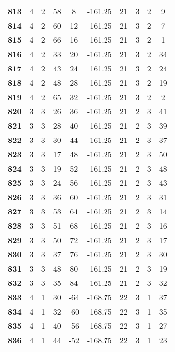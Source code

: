 \documentclass{article}%
\begin{document}
\begin{longtable}{cccccccccc}
        \textbf{813} & 4 & 2 & 58 & 8 & -161.25 & 21 & 3 & 2 & 9 \\ 
        \textbf{814} & 4 & 2 & 60 & 12 & -161.25 & 21 & 3 & 2 & 7 \\ 
        \textbf{815} & 4 & 2 & 66 & 16 & -161.25 & 21 & 3 & 2 & 1 \\ 
        \textbf{816} & 4 & 2 & 33 & 20 & -161.25 & 21 & 3 & 2 & 34 \\ 
        \textbf{817} & 4 & 2 & 43 & 24 & -161.25 & 21 & 3 & 2 & 24 \\ 
        \textbf{818} & 4 & 2 & 48 & 28 & -161.25 & 21 & 3 & 2 & 19 \\ 
        \textbf{819} & 4 & 2 & 65 & 32 & -161.25 & 21 & 3 & 2 & 2 \\ 
        \textbf{820} & 3 & 3 & 26 & 36 & -161.25 & 21 & 2 & 3 & 41 \\ 
        \textbf{821} & 3 & 3 & 28 & 40 & -161.25 & 21 & 2 & 3 & 39 \\ 
        \textbf{822} & 3 & 3 & 30 & 44 & -161.25 & 21 & 2 & 3 & 37 \\ 
        \textbf{823} & 3 & 3 & 17 & 48 & -161.25 & 21 & 2 & 3 & 50 \\ 
        \textbf{824} & 3 & 3 & 19 & 52 & -161.25 & 21 & 2 & 3 & 48 \\ 
        \textbf{825} & 3 & 3 & 24 & 56 & -161.25 & 21 & 2 & 3 & 43 \\ 
        \textbf{826} & 3 & 3 & 36 & 60 & -161.25 & 21 & 2 & 3 & 31 \\ 
        \textbf{827} & 3 & 3 & 53 & 64 & -161.25 & 21 & 2 & 3 & 14 \\ 
        \textbf{828} & 3 & 3 & 51 & 68 & -161.25 & 21 & 2 & 3 & 16 \\ 
        \textbf{829} & 3 & 3 & 50 & 72 & -161.25 & 21 & 2 & 3 & 17 \\ 
        \textbf{830} & 3 & 3 & 37 & 76 & -161.25 & 21 & 2 & 3 & 30 \\ 
        \textbf{831} & 3 & 3 & 48 & 80 & -161.25 & 21 & 2 & 3 & 19 \\ 
        \textbf{832} & 3 & 3 & 35 & 84 & -161.25 & 21 & 2 & 3 & 32 \\ 
        \textbf{833} & 4 & 1 & 30 & -64 & -168.75 & 22 & 3 & 1 & 37 \\ 
        \textbf{834} & 4 & 1 & 32 & -60 & -168.75 & 22 & 3 & 1 & 35 \\ 
        \textbf{835} & 4 & 1 & 40 & -56 & -168.75 & 22 & 3 & 1 & 27 \\ 
        \textbf{836} & 4 & 1 & 44 & -52 & -168.75 & 22 & 3 & 1 & 23 \\ 

\end{longtable}
\end{document}
